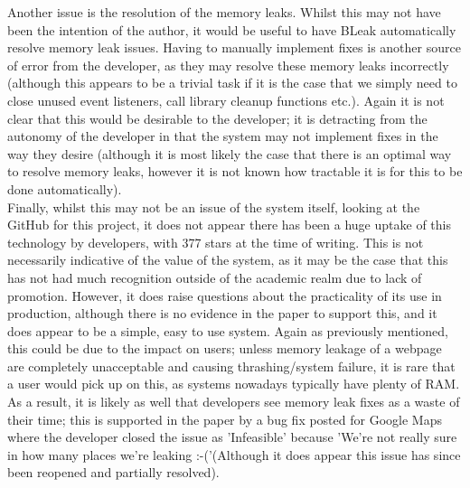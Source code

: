 \documentclass[12pt]{article}
\begin{document}
\begin{enumerate}[(a)]
    Another issue is the resolution of the memory leaks. Whilst this may not have been the intention of the author, it would be useful to have BLeak automatically resolve memory leak issues. Having to manually implement fixes is another source of error from the developer, as they may resolve these memory leaks incorrectly (although this appears to be a trivial task if it is the case that we simply need to close unused event listeners, call library cleanup functions etc.). Again it is not clear that this would be desirable to the developer; it is detracting from the autonomy of the developer in that the system may not implement fixes in the way they desire (although it is most likely the case that there is an optimal way to resolve memory leaks, however it is not known how tractable it is for this to be done automatically). \\\newline
    Finally, whilst this may not be an issue of the system itself, looking at the GitHub for this project, it does not appear there has been a huge uptake of this technology by developers, with 377 stars at the time of writing. This is not necessarily indicative of the value of the system, as it may be the case that this has not had much recognition outside of the academic realm due to lack of promotion. However, it does raise questions about the practicality of its use in production, although there is no evidence in the paper to support this, and it does appear to be a simple, easy to use system. Again as previously mentioned, this could be due to the impact on users; unless memory leakage of a webpage are completely unacceptable and causing thrashing/system failure, it is rare that a user would pick up on this, as systems nowadays typically have plenty of RAM. As a result, it is likely as well that developers see memory leak fixes as a waste of their time; this is supported in the paper by a bug fix posted for Google Maps where the developer closed the issue as 'Infeasible' because 'We're not really sure in how many places we're leaking :-('\supercite{google_accounts}(Although it does appear this issue has since been reopened and partially resolved). 
    \end{enumerate}

\printbibliography
\end{document}
